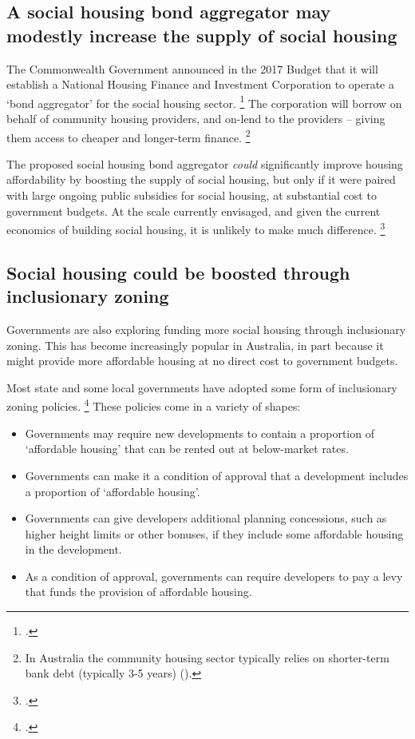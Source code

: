 \subsection{A social housing bond aggregator may modestly increase the supply of social housing}\label{subsec:a-social-housing-bond-aggregator-may-modestly-increase-the-supply-of-social-housing}

The Commonwealth Government announced in the 2017 Budget that it will establish a National Housing Finance and Investment Corporation to operate a `bond aggregator' for the social housing sector.%
	\footcite[][169]{Budget2017-18-BP2}
The corporation will borrow on behalf of community housing providers, and on-lend to the providers -- giving them access to cheaper and longer-term finance.%
	\footnote{In Australia the community housing sector typically relies on shorter-term bank debt (typically 3-5 years) (\textcite[][8]{EY-2017-multi-family-asset-class-australia}).}

The proposed social housing bond aggregator \emph{could} significantly improve housing affordability by boosting the supply of social housing, but only if it were paired with large ongoing public subsidies for social housing, at substantial cost to government budgets.
At the scale currently envisaged, and given the current economics of building social housing, it is unlikely to make much difference.%
	\footcite{Daley-etal-2017-Submission-Natl-housing-finance}

\subsection{Social housing could be boosted through inclusionary zoning}\label{subsec:Social-housing-and-inclusionary-zoning}

Governments are also exploring funding more social housing through inclusionary zoning.
This has become increasingly popular in Australia, in part because it might provide more affordable housing at no direct cost to government budgets.

Most state and some local governments have adopted some form of inclusionary zoning policies.%
    \footcite[][8--9]{Daley-etal-2017-Submission-Natl-housing-finance}
These policies come in a variety of shapes:

\begin{itemize}
    \item
    Governments may require new developments to contain a proportion of `affordable housing' that can be rented out at below-market rates.
    \item
    Governments can make it a condition of approval that a development includes a proportion of `affordable housing'. 
    \item
    Governments can give developers additional planning concessions, such as higher height limits or other bonuses, if they include some affordable housing in the development. 
    \item
    As a condition of approval, governments can require developers to pay a levy that funds the provision of affordable housing.
\end{itemize}

